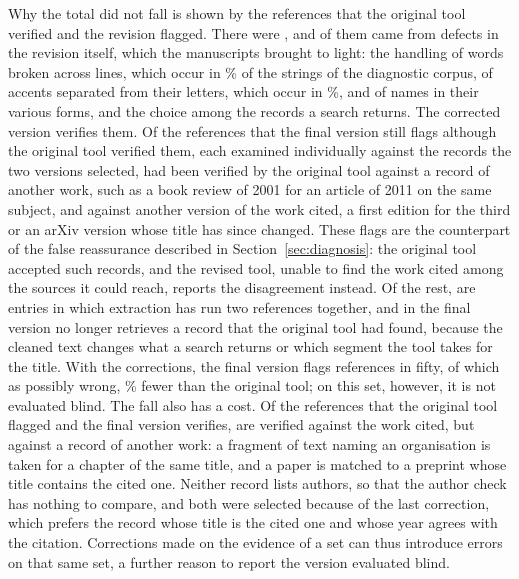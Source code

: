 \documentclass[pdflatex,sn-apa]{sn-jnl}
\begin{document}
\begin{table}[tb]
\centering
\caption{Linear probability models of the probability that a reference string of the \CorpMss{} manuscripts is presented as possibly wrong (not found, partial match or mismatch), in percentage points, for each version of the tool. The share of strings with each feature is given after its name; standard errors clustered by manuscript are in parentheses. $^{***}\,p<0.01$, $^{**}\,p<0.05$, $^{*}\,p<0.1$.}
\label{tab:regression}
\vspace{4pt}
\small

\end{table}

Why the total did not fall is shown by the references that the original tool verified and the revision flagged. There were \CorpNewFlagsBlind{}, and \CorpNewFlagsBlindCleared{} of them came from defects in the revision itself, which the manuscripts brought to light: the handling of words broken across lines, which occur in \FeatHyphenAll{}\% of the strings of the diagnostic corpus, of accents separated from their letters, which occur in \FeatAccentAll{}\%, and of names in their various forms, and the choice among the records a search returns. The corrected version verifies them. Of the \ChangesN{} references that the final version still flags although the original tool verified them, each examined individually against the records the two versions selected, \ChangesOther{} had been verified by the original tool against a record of another work, such as a book review of 2001 for an article of 2011 on the same subject, and \ChangesVersion{} against another version of the work cited, a first edition for the third or an arXiv version whose title has since changed. These flags are the counterpart of the false reassurance described in Section~\ref{sec:diagnosis}: the original tool accepted such records, and the revised tool, unable to find the work cited among the sources it could reach, reports the disagreement instead. Of the rest, \ChangesDamage{} are entries in which extraction has run two references together, and in \ChangesLost{} the final version no longer retrieves a record that the original tool had found, because the cleaned text changes what a search returns or which segment the tool takes for the title. With the corrections, the final version flags \CorpFlagFiftyRev{} references in fifty, of which \CorpScrutFiftyRev{} as possibly wrong, \CorpScrutDropRev{}\% fewer than the original tool; on this set, however, it is not evaluated blind. The fall also has a cost. Of the \ClearedN{} references that the original tool flagged and the final version verifies, \ClearedRight{} are verified against the work cited, but \ClearedWrong{} against a record of another work: a fragment of text naming an organisation is taken for a chapter of the same title, and a paper is matched to a preprint whose title contains the cited one. Neither record lists authors, so that the author check has nothing to compare, and both were selected because of the last correction, which prefers the record whose title is the cited one and whose year agrees with the citation. Corrections made on the evidence of a set can thus introduce errors on that same set, a further reason to report the version evaluated blind.
\end{document}
